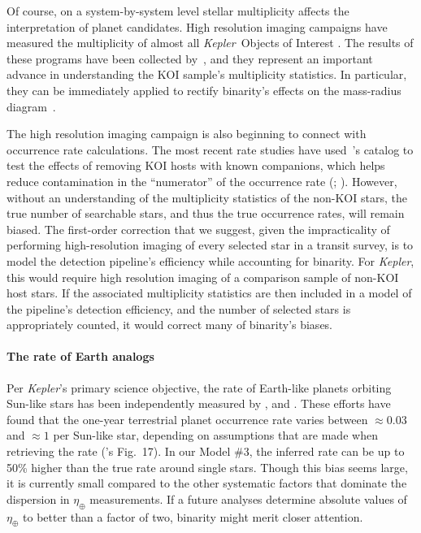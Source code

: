 \documentclass[12pt,modern]{aastex61}
\begin{document}
Of course, on a system-by-system level stellar multiplicity affects the 
interpretation of planet candidates. High resolution imaging 
campaigns have measured the multiplicity of almost all {\it Kepler}\ Objects 
of Interest 
\citep{howell_speckle_2011,adams_adaptive_2012,adams_adaptive_2013,horch_observations_2012,
    horch_most_2014,lillo-box_multiplicity_2012,lillo-box_high-resolution_2014,dressing_adaptive_2014,
    law_robotic_2014,cartier_revision_2015,everett_high-resolution_2015,gilliland_hubble_2015,
    wang_influence_2015,wang_influence_2015-1,baranec_robo-ao_2016,ziegler_robo-ao_2017}.
The results of these programs have been collected 
by~\citet{furlan_kepler_2017}, and they represent an important advance in 
understanding the KOI 
sample's multiplicity statistics.
In particular, they can be immediately applied to rectify binarity's effects 
on the mass-radius diagram~\citep{furlan_densities_2017}.

The high resolution imaging campaign is also beginning to connect with
occurrence rate calculations.
The most recent rate studies have used~\citet{furlan_kepler_2017}'s 
catalog to test the effects of removing KOI hosts with known companions, which 
helps reduce contamination in the ``numerator'' of 
the occurrence rate (\citealt{fulton_california-_2017}; 
\citealt{petigura_CKS_2017}).
However, without an understanding of the multiplicity statistics of the 
non-KOI stars, the true number of searchable stars, and thus the true 
occurrence rates, will remain biased.
The first-order correction that we suggest, given the impracticality of 
performing high-resolution imaging of every selected star in a transit survey,
is to model the detection pipeline's efficiency while accounting for 
binarity.
For {\it Kepler}, this would require high resolution imaging of a
comparison sample of non-KOI host stars. If the associated multiplicity 
statistics are then included in a model of the pipeline's detection 
efficiency, and the number of selected stars is appropriately counted, it 
would correct many of binarity's biases.


\paragraph{The rate of Earth analogs}
Per {\it Kepler}'s primary science objective, the rate of Earth-like planets 
orbiting Sun-like stars has been independently measured by 
\citet{youdin_exoplanet_2011,petigura_prevalence_2013,dong_fast_2013,
    foreman-mackey_exoplanet_2014}, and \citet{burke_terrestrial_2015}.
These efforts have found that the one-year terrestrial planet occurrence rate 
varies between $\approx 0.03$ and $\approx 1$ per Sun-like star, depending on 
assumptions that are made when retrieving the rate 
(\citealt{burke_terrestrial_2015}'s Fig.~17).
In our Model \#3, the inferred rate can be up to 50\% higher than the true 
rate around single stars.
Though this bias seems large, it is currently small compared to the other 
systematic factors that dominate the dispersion in $\eta_\oplus$ 
measurements.
If a future analyses determine absolute values of $\eta_\oplus$ to 
better than a factor of two, binarity might merit closer attention.
\end{document}
